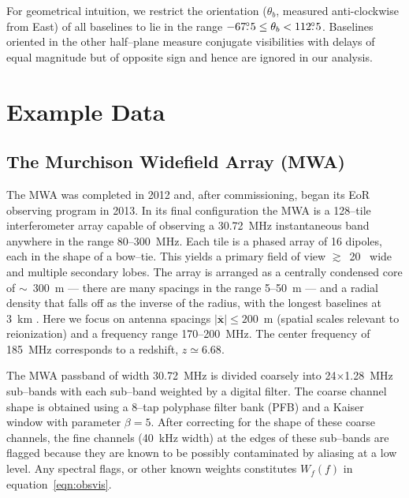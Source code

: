 \documentclass[preprint2,iop,numberedappendix]{emulateapj}
\begin{document}

For geometrical intuition, we restrict the orientation ($\theta_b$, measured anti-clockwise from East) of all baselines to lie in the range $-67\mbox{$.\!\!^\circ$} 5 \leq \theta_b < 112\mbox{$.\!\!^\circ$} 5$. Baselines oriented in the other half--plane measure conjugate visibilities with delays of equal magnitude but of opposite sign and hence are ignored in our analysis.

\section{Example Data}\label{sec:instrument}

\subsection{The Murchison Widefield Array (MWA)}

The MWA was completed in 2012 and, after commissioning, began its EoR observing program in 2013. In its final configuration the MWA is a 128--tile interferometer array capable of observing a 30.72~MHz instantaneous band anywhere in the range 80--300~MHz. Each tile is a phased array of 16 dipoles, each in the shape of a bow--tie. This yields a primary field of view $\gtrsim$~20\arcdeg~ wide and multiple secondary lobes. The array is arranged as a centrally condensed core of $\sim$~300~m --- there are many spacings in the range 5--50~m --- and a radial density that falls off as the inverse of the radius, with the longest baselines at 3~km \citep{bea12}. Here we focus on antenna spacings $|\overline{\mathbf{x}}| \le 200$~m (spatial scales relevant to reionization) and a frequency range 170--200~MHz. The center frequency of 185~MHz corresponds to a redshift, $z\simeq 6.68$.

The MWA passband of width 30.72~MHz is divided coarsely into 24$\times$1.28~MHz sub--bands with each sub--band weighted by a digital filter. The coarse channel shape is obtained using a 8--tap polyphase filter bank (PFB) and a Kaiser window with parameter $\beta=5$. After correcting for the shape of these coarse channels, the fine channels (40~kHz width) at the edges of these sub--bands are flagged because they are known to be possibly contaminated by aliasing at a low level. Any spectral flags, or other known weights constitutes $W_f(f)$ in equation~\ref{eqn:obsvis}. 
\end{document}
